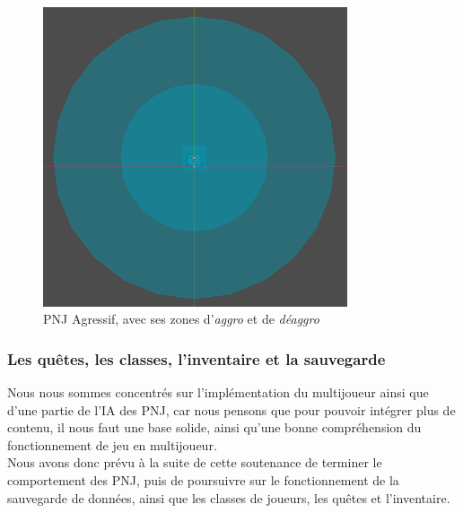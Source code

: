 \begin{figure}[H]
    \centering
    \includegraphics[width=0.8\textwidth]{2.game/assets/gameplay6.png}
    \caption{PNJ Agressif, avec ses zones d'\textit{aggro} et de \textit{déaggro}}
    \label{fig:gameplay6}
\end{figure}


\subsubsection*{Les quêtes, les classes, l'inventaire et la sauvegarde}

Nous nous sommes concentrés sur l'implémentation du multijoueur ainsi que d'une partie de l'IA des PNJ, car nous pensons que pour pouvoir intégrer plus de contenu, il nous faut une base solide, ainsi qu'une bonne compréhension du fonctionnement de jeu en multijoueur.
\\

Nous avons donc prévu à la suite de cette soutenance de terminer le comportement des PNJ, puis de poursuivre sur le fonctionnement de la sauvegarde de données, ainsi que les classes de joueurs, les quêtes et l'inventaire.
